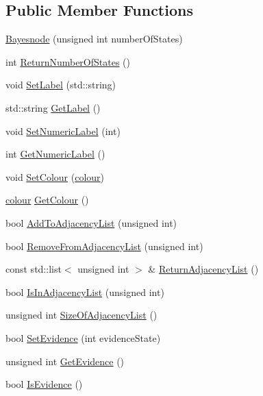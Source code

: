 \subsection*{Public Member Functions}
\begin{DoxyCompactItemize}
\item 
\hyperlink{classbayonet_1_1_bayesnode_a2b676188453fbbb4dc96be714ac931d3}{Bayesnode} (unsigned int number\-Of\-States)
\item 
int \hyperlink{classbayonet_1_1_bayesnode_a25297ec446c6be1a79e70d3930bef834}{Return\-Number\-Of\-States} ()
\item 
void \hyperlink{classbayonet_1_1_bayesnode_abaa27f1597d5599344e3a4d82e7b64b0}{Set\-Label} (std\-::string)
\item 
std\-::string \hyperlink{classbayonet_1_1_bayesnode_aebe7f411efe8b8647ed6f7d28f700638}{Get\-Label} ()
\item 
void \hyperlink{classbayonet_1_1_bayesnode_adbda396fa53b6923a69824c98fce9ca1}{Set\-Numeric\-Label} (int)
\item 
int \hyperlink{classbayonet_1_1_bayesnode_a347df4c4cac0f04f6b263a3523ea37d5}{Get\-Numeric\-Label} ()
\item 
void \hyperlink{classbayonet_1_1_bayesnode_a1102ecda4b933a2ccce879ca520a795e}{Set\-Colour} (\hyperlink{classbayonet_1_1_bayesnode_aaf4b5ea18ef0c14f2baae9bff0ef9199}{colour})
\item 
\hyperlink{classbayonet_1_1_bayesnode_aaf4b5ea18ef0c14f2baae9bff0ef9199}{colour} \hyperlink{classbayonet_1_1_bayesnode_a9f4a34547a9dab484a683450cd68691c}{Get\-Colour} ()
\item 
bool \hyperlink{classbayonet_1_1_bayesnode_ab3c6995309d67dd9b30c645fbb1cb739}{Add\-To\-Adjacency\-List} (unsigned int)
\item 
bool \hyperlink{classbayonet_1_1_bayesnode_a96768ee5d89848d3275c7d916faad480}{Remove\-From\-Adjacency\-List} (unsigned int)
\item 
const std\-::list$<$ unsigned int $>$ \& \hyperlink{classbayonet_1_1_bayesnode_ad20de796507c48523bcf49fffdc7b3d5}{Return\-Adjacency\-List} ()
\item 
bool \hyperlink{classbayonet_1_1_bayesnode_a531f3d3341170ba4ea6d646f1a368b54}{Is\-In\-Adjacency\-List} (unsigned int)
\item 
unsigned int \hyperlink{classbayonet_1_1_bayesnode_a33a92e17091b3d0361d63eeadbbd39b6}{Size\-Of\-Adjacency\-List} ()
\item 
bool \hyperlink{classbayonet_1_1_bayesnode_a8478f3ae03c4a479dba6b1f9cb2c69af}{Set\-Evidence} (int evidence\-State)
\item 
unsigned int \hyperlink{classbayonet_1_1_bayesnode_a783735e7bb2ec04a07a209a8c83f95cd}{Get\-Evidence} ()
\item 
bool \hyperlink{classbayonet_1_1_bayesnode_a71a90c0403ecb1441d43af3978200fd2}{Is\-Evidence} ()
\end{DoxyCompactItemize}
